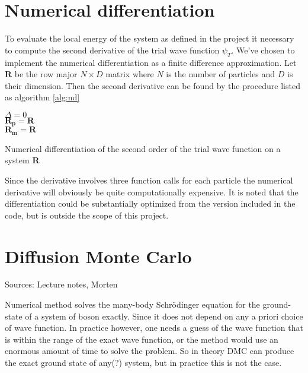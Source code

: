 \section{Numerical differentiation}
To evaluate the local energy of the system as defined in the project it necessary to compute the second derivative of the trial wave function $\psi_T$. We've chosen to implement the numerical differentiation as a finite difference approximation. Let $\mathbf{R}$ be the row major $N \times D$ matrix where $N$ is the number of particles and $D$ is their dimension. Then the second derivative can be found by the procedure listed as algorithm \ref{alg:nd}

\begin{algorithm}
\BlankLine
$\Delta = 0$ \\
$\mathbf{R_p} = \mathbf{R}$\\
$\mathbf{R_m} = \mathbf{R}$\\
\BlankLine
{}
\BlankLine
\caption{Numerical differentiation of the second order of the trial wave function on a system $\mathbf{R}$}\label{alg:nd}
\end{algorithm} 

Since the derivative involves three function calls for each particle the numerical derivative will obviously be quite computationally expensive. It is noted  that the differentiation could be substantially optimized from the version included in the code, but is outside the scope of this project. 

\section{Diffusion Monte Carlo}

Sources: Lecture notes, Morten \cite{hjorthjensen}

Numerical method solves the many-body Schrödinger equation for the ground-state of a system of boson exactly. Since it does not depend on any a priori choice of wave function. In practice however, one needs a guess of the wave function that is within the range of the exact wave function, or the method would use an enormous amount of time to solve the problem. So in theory DMC can produce the exact ground state of any(?) system, but in practice this is not the case. 

